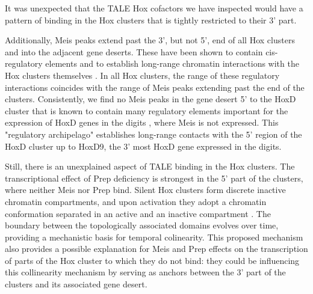 It was unexpected that the \ac{TALE} Hox cofactors we have inspected would have a pattern of binding in the Hox clusters that is tightly restricted to their 3' part. %

Additionally, Meis peaks extend past the 3', but not 5', end of all Hox clusters and into the adjacent gene deserts. These have been shown to contain cis-regulatory elements and to establish long-range chromatin interactions with the Hox clusters themselves \parencite{Noordermeer2011, Andrey2013}. In all Hox clusters, the range of these regulatory interactions coincides with the range of Meis peaks extending past the end of the clusters. Consistently, we find no Meis peaks in the gene desert 5' to the HoxD cluster that is known to contain many regulatory elements important for the expression of HoxD genes in the digits \parencite{Montavon2011}, where Meis is not expressed. This "regulatory archipelago" establishes long-range contacts with the 5' region of the HoxD cluster up to HoxD9, the 3' most HoxD gene expressed in the digits. 

Still, there is an unexplained aspect of \ac{TALE} binding in the Hox clusters. The transcriptional effect of Prep deficiency is strongest in the 5' part of the clusters, where neither Meis nor Prep bind. Silent Hox clusters form discrete inactive chromatin compartments, and upon activation they adopt a chromatin conformation separated in an active and an inactive compartment \parencite{Noordermeer2011}. The boundary between the topologically associated domains evolves over time, providing a mechanistic basis for temporal colinearity. This proposed mechanism also provides a possible explanation for Meis and Prep effects on the transcription of parts of the Hox cluster to which they do not bind: they could be influencing this collinearity mechanism by serving as anchors between the 3' part of the clusters and its associated gene desert. 



